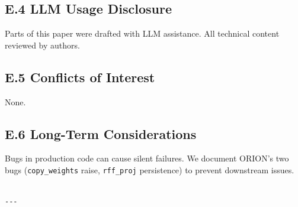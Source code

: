 \subsection{E.4 LLM Usage Disclosure}

Parts of this paper were drafted with LLM assistance. All technical content 
reviewed by authors.

\subsection{E.5 Conflicts of Interest}

None.

\subsection{E.6 Long-Term Considerations}

Bugs in production code can cause silent failures. We document ORION's 
two bugs (\texttt{copy\_weights} raise, \texttt{rff\_proj} persistence) to prevent 
downstream issues.
\begin{lstlisting}

---
\end{lstlisting}